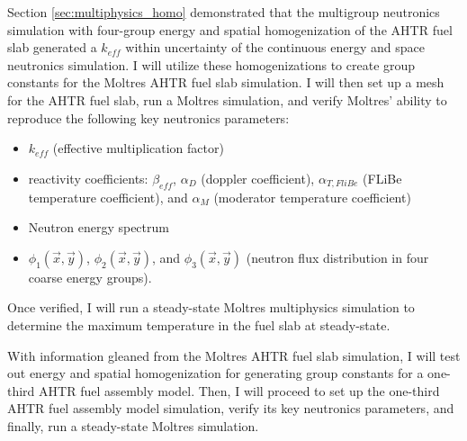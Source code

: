 Section \ref{sec:multiphysics_homo} demonstrated that the multigroup neutronics 
simulation with four-group energy and spatial homogenization of the \gls{AHTR} 
fuel slab generated a $k_{eff}$ within uncertainty of the continuous energy and 
space neutronics simulation. I will utilize these homogenizations to create 
group constants for the Moltres \gls{AHTR} fuel slab simulation. I will then 
set up a mesh for the \gls{AHTR} fuel slab, run a Moltres simulation, and 
verify Moltres' ability to reproduce the following key neutronics parameters: 
\begin{itemize}
  \item $k_{eff}$ (effective multiplication factor)
  \item reactivity coefficients: $\beta_{eff}$, $\alpha_D$ (doppler coefficient), 
  $\alpha_{T, FliBe}$ (\gls{FLiBe} temperature coefficient), and $\alpha_{M}$ 
  (moderator temperature coefficient)
  \item Neutron energy spectrum 
  \item $\phi_1(\vec{x},\vec{y})$, $\phi_2(\vec{x},\vec{y})$, and $\phi_3(\vec{x},\vec{y})$ 
  (neutron flux distribution in four coarse energy groups). 
\end{itemize}
Once verified, I will run a steady-state Moltres multiphysics simulation to 
determine the maximum temperature in the fuel slab at steady-state. 

With information gleaned from the Moltres \gls{AHTR} fuel slab simulation, I 
will test out energy and spatial homogenization for generating group constants 
for a one-third \gls{AHTR} fuel assembly model.  
Then, I will proceed to set up the one-third \gls{AHTR} fuel assembly model 
simulation, verify its key neutronics parameters, and finally, run a steady-state 
Moltres simulation.

